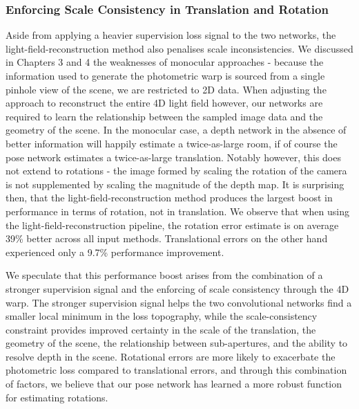 \subsubsection{Enforcing Scale Consistency in Translation and Rotation}
Aside from applying a heavier supervision loss signal to the two networks, the light-field-reconstruction method also penalises scale inconsistencies. We discussed in Chapters 3 and 4 the weaknesses of monocular approaches - because the information used to generate the photometric warp is sourced from a single pinhole view of the scene, we are restricted to 2D data. When adjusting the approach to reconstruct the entire 4D light field however, our networks are required to learn the relationship between the sampled image data and the geometry of the scene. In the monocular case, a depth network in the absence of better information will happily estimate a twice-as-large room, if of course the pose network estimates a twice-as-large translation. Notably however, this does not extend to rotations - the image formed by scaling the rotation of the camera is not supplemented by scaling the magnitude of the depth map. It is surprising then, that the light-field-reconstruction method produces the largest boost in performance in terms of rotation, not in translation. We observe that when using the light-field-reconstruction pipeline, the rotation error estimate is on average 39\% better across all input methods. Translational errors on the other hand experienced only a 9.7\% performance improvement.

We speculate that this performance boost arises from the combination of a stronger supervision signal and the enforcing of scale consistency through the 4D warp. The stronger supervision signal helps the two convolutional networks find a smaller local minimum in the loss topography, while the scale-consistency constraint provides improved certainty in the scale of the translation, the geometry of the scene, the relationship between sub-apertures, and the ability to resolve depth in the scene. Rotational errors are more likely to exacerbate the photometric loss compared to translational errors, and through this combination of factors, we believe that our pose network has learned a more robust function for estimating rotations. 

